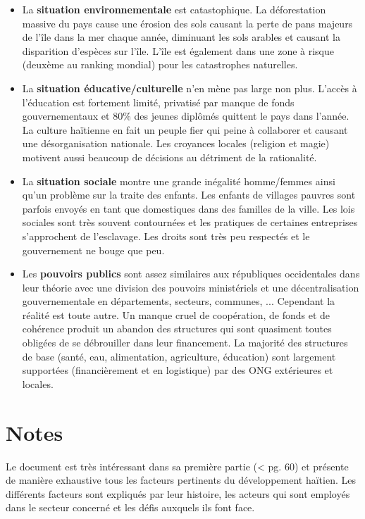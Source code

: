 \documentclass[a4paper, 11pt]{article}
\begin{document}
\begin{itemize}
  \item La \textbf{situation environnementale} est catastophique. La déforestation massive du pays cause une érosion des sols causant la perte de pans majeurs de l'île dans la mer chaque année, diminuant les sols arables et causant la disparition d'espèces sur l'île. L'île est également dans une zone à risque (deuxème au ranking mondial) pour les catastrophes naturelles.
  \item La \textbf{situation éducative/culturelle} n'en mène pas large non plus. L'accès à l'éducation est fortement limité, privatisé par manque de fonds gouvernementaux et 80\% des jeunes diplômés quittent le pays dans l'année. La culture haïtienne en fait un peuple fier qui peine à collaborer et causant une désorganisation nationale. Les croyances locales (religion et magie) motivent aussi beaucoup de décisions au détriment de la rationalité.
  \item La \textbf{situation sociale} montre une grande inégalité homme/femmes ainsi qu'un problème sur la traite des enfants. Les enfants de villages pauvres sont parfois envoyés en tant que domestiques dans des familles de la ville. Les lois sociales sont très souvent contournées et les pratiques de certaines entreprises s'approchent de l'esclavage. Les droits sont très peu respectés et le gouvernement ne bouge que peu.
  \item Les \textbf{pouvoirs publics} sont assez similaires aux républiques occidentales dans leur théorie avec une division des pouvoirs ministériels et une décentralisation gouvernementale en départements, secteurs, communes, ... Cependant la réalité est toute autre. Un manque cruel de coopération, de fonds et de cohérence produit un abandon des structures qui sont quasiment toutes obligées de se débrouiller dans leur financement. La majorité des structures de base (santé, eau, alimentation, agriculture, éducation) sont largement supportées (financièrement et en logistique) par des ONG extérieures et locales.
\end{itemize}

\section*{Notes}
Le document est très intéressant dans sa première partie (< pg. 60) et présente de manière exhaustive tous les facteurs pertinents du développement haïtien.
Les différents facteurs sont expliqués par leur histoire, les acteurs qui sont employés dans le secteur concerné et les défis auxquels ils font face.
\end{document}
